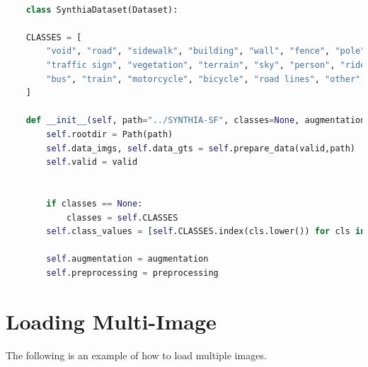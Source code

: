 \documentclass[11pt,a4paper]{article}
\begin{document}
    \begin{lstlisting}[language=Python, caption=Write the caption here
    class,label={labelkode}]
    
    class SynthiaDataset(Dataset):

    CLASSES = [
        "void", "road", "sidewalk", "building", "wall", "fence", "pole", "traffic light", 
        "traffic sign", "vegetation", "terrain", "sky", "person", "rider", "car", "truck", 
        "bus", "train", "motorcycle", "bicycle", "road lines", "other", "road works"
    ]
    
    def __init__(self, path="../SYNTHIA-SF", classes=None, augmentation=None, preprocessing=None, valid=False):
        self.rootdir = Path(path)
        self.data_imgs, self.data_gts = self.prepare_data(valid,path)
        self.valid = valid

    
        if classes == None:
            classes = self.CLASSES 
        self.class_values = [self.CLASSES.index(cls.lower()) for cls in classes]
        
        self.augmentation = augmentation
        self.preprocessing = preprocessing
    \end{lstlisting}

\section{Loading Multi-Image}
The following is an example of how to load multiple images.
\end{document}
